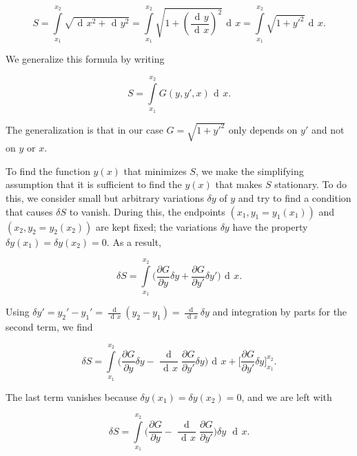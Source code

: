 \documentclass{article}
\DeclareMathOperator{\dd}{\!d\!}
\begin{document}
\begin{equation}
S=\int\limits_{x_1}^{x_2}\sqrt{\dd x^2 + \dd y^2} %
= \int\limits_{x_1}^{x_2}\sqrt{1 + \left(\frac{\dd y}{\dd x}\right)^2} \dd x
= \int\limits_{x_1}^{x_2}\sqrt{1 + y'^2} \dd x.
\end{equation}

We generalize this formula by writing

\begin{equation}
S=\int\limits_{x_1}^{x_2} G(y,y',x) \dd x .
\end{equation}

The generalization is that in our case $G = \sqrt{1 + y'^2}$ only depends on $y'$ and not on $y$ or $x$.

To find the function $y(x)$ that minimizes $S$, we make the simplifying assumption that it is sufficient to find the $y(x)$ that makes $S$ stationary. To do this, we consider small but arbitrary variations $\delta y$ of $y$ and try to find a condition that causes $\delta S$ to vanish. During this, the endpoints $(x_1,y_1=y_1(x_1))$ %
and $(x_2,y_2=y_2(x_2))$ are kept fixed; the variations $\delta y$ have the property $\delta y(x_1) = \delta y(x_2) = 0$. As a result,

\begin{equation}
\delta S = \int\limits_{x_1}^{x_2} \bigg(\frac{\partial G}{\partial y} \delta y 
+ \frac{\partial G}{\partial y'} \delta y' \bigg) \dd x.
\end{equation}

Using $\delta y' = y_2' - y_1' = \frac{\dd }{\dd x}(y_2 - y_1) = \frac{\dd}{\dd x} \delta y$ and integration by parts for the second term, we find

\begin{equation}
\delta S = \int\limits_{x_1}^{x_2} \bigg( \frac{\partial G}{\partial y} \delta y 
- \frac{\dd}{\dd x}\frac{\partial G}{\partial y'} \delta y \bigg) \dd x 
+ \bigg[\frac{\partial G}{\partial y'} \delta y \bigg]_{x_1}^{x_2}.
\end{equation}

The last term vanishes because $\delta y(x_1) = \delta y(x_2) = 0$, and we are left with


\begin{equation}
\delta S = \int\limits_{x_1}^{x_2} \bigg( \frac{\partial G}{\partial y} 
- \frac{\dd}{\dd x}\frac{\partial G}{\partial y'} \bigg) \delta y \; \dd x.
\end{equation}
\end{document}
